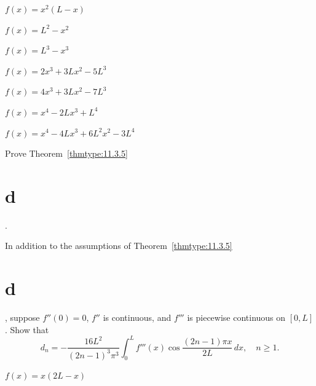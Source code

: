 \begin{exerciselist}
  \item\label{exer:11.3.43} \Cex $f(x)=x^{2}(L-x)$

  \item\label{exer:11.3.44} $f(x)=L^{2}-x^{2}$

  \item\label{exer:11.3.45} $f(x)=L^{3}-x^{3}$

  \item\label{exer:11.3.46} $f(x)=2x^{3}+3Lx^{2}-5L^{3}$

  \item\label{exer:11.3.47} $f(x)=4x^{3}+3Lx^{2}-7L^{3}$

  \item\label{exer:11.3.48} $f(x)=x^{4}-2Lx^{3}+L^{4}$

  \item\label{exer:11.3.49} $f(x)=x^{4}-4Lx^{3}+6L^{2}x^{2}-3L^{4}$

  \item\label{exer:11.3.50}
  \begin{alist}
    \item %
    Prove Theorem~\ref{thmtype:11.3.5}\part{d}.

    \item %
    In addition to the assumptions of Theorem~\ref{thmtype:11.3.5}\part{d}, suppose $f''(0)=0$,
    $f''$ is continuous, and $f'''$ is piecewise continuous on $[0,L]$. Show that
    \[
      d_{n}=-\frac{16L^{2}}{(2n-1)^{3}\pi^{3}}\int_{0}^{L}f'''(x)\cos\frac{(2n-1)\pi x}{2L}\,dx,\quad n\ge1.
    \]
  \end{alist}


  \item\label{exer:11.3.51} $f(x)=x(2L-x)$


\end{exerciselist}
